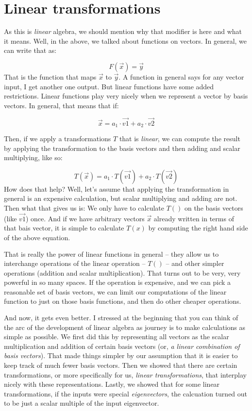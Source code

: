 \documentclass[
]{book}
\begin{document}
\hypertarget{linear-transformations}{%
\section{Linear transformations}\label{linear-transformations}}

As this is \emph{linear} algebra, we should mention why that modifier is here and what it means. Well, in the above, we talked about functions on vectors. In general, we can write that as:

\[ F(\vec{x}) = \vec{y}\]
That is the function that maps \(\vec{x}\) to \(\vec{y}\). A function in general says for any vector input, I get another one output. But linear functions have some added restrictions. Linear functions play very nicely when we represent a vector by basis vectors. In general, that means that if:

\[\vec{x} = a_{1}\cdot\vec{v1} + a_{2}\cdot\vec{v2}\]

Then, if we apply a transformations \(T\) that is \emph{linear}, we can compute the result by applying the transformation to the basis vectors and then adding and scalar multiplying, like so:

\[T(\vec{x}) = a_{1}\cdot T(\vec{v1}) + a_{2}\cdot T(\vec{v2})\]
How does that help? Well, let's assume that applying the transformation in general is an expensive calculation, but scalar multiplying and adding are not. Then what that gives us is: We only have to calculate \(T()\) on the basis vectors (like \(\vec{v1}\)) once. And if we have arbitrary vectors \(\vec{x}\) already written in terms of that bais vector, it is simple to calculate \(T(x)\) by computing the right hand side of the above equation.

That is really the power of linear functions in general -- they allow us to interchange operations of the linear operation -- \(T()\) -- and other simpler operations (addition and scalar multiplication). That turns out to be very, very powerful in so many spaces. If the operation is expensive, and we can pick a reasonable set of basis vectors, we can limit our computations of the linear function to just on those basis functions, and then do other cheaper operations.

And now, it gets even better. I stressed at the beginning that you can think of the arc of the development of linear algebra as journey is to make calculations as simple as possible. We first did this by representing all vectors as the scalar multiplication and addition of certain basis vectors (or, \emph{a linear combination of basis vectors}). That made things simpler by our assumption that it is easier to keep track of much fewer basis vectors. Then we showed that there are certain transformations, or more specifically for us, \emph{linear transformations}, that interplay nicely with these representations. Lastly, we showed that for some linear transformations, if the inputs were special \emph{eigenvectors}, the calcuation turned out to be just a scalar multiple of the input eigenvector.
\end{document}
